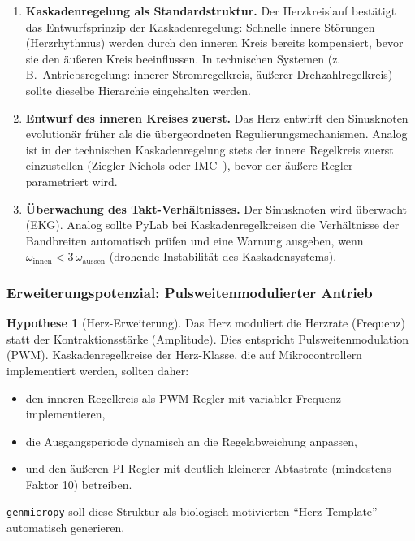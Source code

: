 \documentclass[a4paper,12pt]{article}
\theoremstyle{definition}
\newtheorem{hypothese}{Hypothese}
\begin{document}
\begin{enumerate}
	\item \textbf{Kaskadenregelung als Standardstruktur.}
	Der Herzkreislauf bestätigt das Entwurfsprinzip der Kaskadenregelung:
	Schnelle innere Störungen (Herzrhythmus) werden durch den inneren
	Kreis bereits kompensiert, bevor sie den äußeren Kreis beeinflussen.
	In technischen Systemen (z.\,B.\ Antriebsregelung: innerer
	Stromregelkreis, äußerer Drehzahlregelkreis) sollte dieselbe
	Hierarchie eingehalten werden.
	
	\item \textbf{Entwurf des inneren Kreises zuerst.}
	Das Herz entwirft den Sinusknoten evolutionär früher als die
	übergeordneten Regulierungsmechanismen. Analog ist in der technischen
	Kaskadenregelung stets der innere Regelkreis zuerst einzustellen
	(Ziegler-Nichols oder IMC~\cite{astrom}), bevor der äußere Regler
	parametriert wird.
	
	\item \textbf{Überwachung des Takt-Verhältnisses.}
	Der Sinusknoten wird überwacht (EKG). Analog sollte PyLab bei
	Kaskadenregelkreisen die Verhältnisse der Bandbreiten automatisch
	prüfen und eine Warnung ausgeben, wenn $\omega_{\text{innen}} <
	3\, \omega_{\text{aussen}}$ (drohende Instabilität des Kaskadensystems).
\end{enumerate}

\subsubsection{Erweiterungspotenzial: Pulsweitenmodulierter Antrieb}

\begin{hypothese}[Herz-Erweiterung]
	Das Herz moduliert die Herzrate (Frequenz) statt der Kontraktionsstärke
	(Amplitude). Dies entspricht Pulsweitenmodulation (PWM). Kaskadenregelkreise
	der Herz-Klasse, die auf Mikrocontrollern implementiert werden,
	sollten daher:
	\begin{itemize}
		\item den inneren Regelkreis als PWM-Regler mit variabler Frequenz
		implementieren,
		\item die Ausgangsperiode dynamisch an die Regelabweichung anpassen,
		\item und den äußeren PI-Regler mit deutlich kleinerer Abtastrate
		(mindestens Faktor 10) betreiben.
	\end{itemize}
	\texttt{genmicropy} soll diese Struktur als biologisch motivierten
	``Herz-Template'' automatisch generieren.
\end{hypothese}
\end{document}
